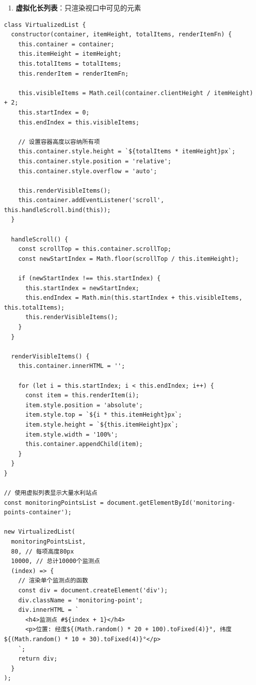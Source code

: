 \begin{enumerate}
\def\labelenumi{\arabic{enumi}.}
\setcounter{enumi}{2}
\tightlist
\item
  \textbf{虚拟化长列表}：只渲染视口中可见的元素
\end{enumerate}

\begin{lstlisting}
class VirtualizedList {
  constructor(container, itemHeight, totalItems, renderItemFn) {
    this.container = container;
    this.itemHeight = itemHeight;
    this.totalItems = totalItems;
    this.renderItem = renderItemFn;
    
    this.visibleItems = Math.ceil(container.clientHeight / itemHeight) + 2;
    this.startIndex = 0;
    this.endIndex = this.visibleItems;
    
    // 设置容器高度以容纳所有项
    this.container.style.height = `${totalItems * itemHeight}px`;
    this.container.style.position = 'relative';
    this.container.style.overflow = 'auto';
    
    this.renderVisibleItems();
    this.container.addEventListener('scroll', this.handleScroll.bind(this));
  }
  
  handleScroll() {
    const scrollTop = this.container.scrollTop;
    const newStartIndex = Math.floor(scrollTop / this.itemHeight);
    
    if (newStartIndex !== this.startIndex) {
      this.startIndex = newStartIndex;
      this.endIndex = Math.min(this.startIndex + this.visibleItems, this.totalItems);
      this.renderVisibleItems();
    }
  }
  
  renderVisibleItems() {
    this.container.innerHTML = '';
    
    for (let i = this.startIndex; i < this.endIndex; i++) {
      const item = this.renderItem(i);
      item.style.position = 'absolute';
      item.style.top = `${i * this.itemHeight}px`;
      item.style.height = `${this.itemHeight}px`;
      item.style.width = '100%';
      this.container.appendChild(item);
    }
  }
}

// 使用虚拟列表显示大量水利站点
const monitoringPointsList = document.getElementById('monitoring-points-container');

new VirtualizedList(
  monitoringPointsList,
  80, // 每项高度80px
  10000, // 总计10000个监测点
  (index) => {
    // 渲染单个监测点的函数
    const div = document.createElement('div');
    div.className = 'monitoring-point';
    div.innerHTML = `
      <h4>监测点 #${index + 1}</h4>
      <p>位置: 经度${(Math.random() * 20 + 100).toFixed(4)}°, 纬度${(Math.random() * 10 + 30).toFixed(4)}°</p>
    `;
    return div;
  }
);
\end{lstlisting}

